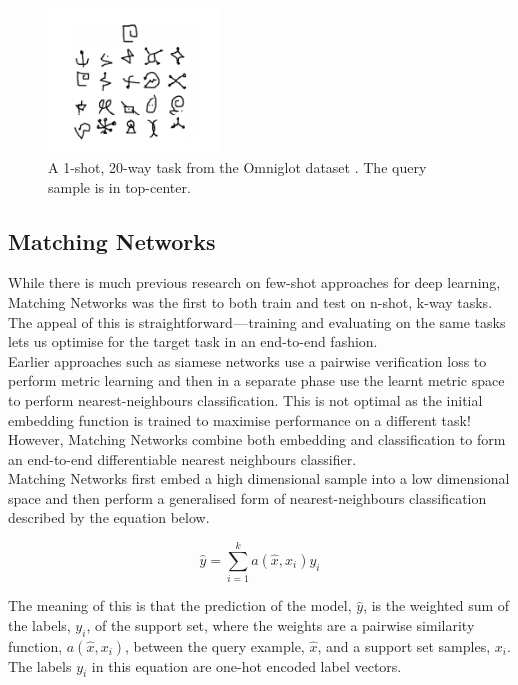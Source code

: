 \documentclass[runningheads,a4paper]{llncs}
\begin{document}
\begin{figure}[!ht]
    \centering
    \includegraphics[width=0.4\textwidth]{background/omniglot_1_shot_20_way_task_example.png}
    \caption{A 1-shot, 20-way task from the Omniglot dataset \cite{omniglot}. The query sample is in top-center.}
    \label{figure:background:omniglot_sample}
\end{figure}

\subsection{Matching Networks}

While there is much previous research on few-shot approaches for deep learning, Matching Networks \cite{matchingnet} was the first to both train and test on n-shot, k-way tasks. The appeal of this is straightforward — training and evaluating on the same tasks lets us optimise for the target task in an end-to-end fashion. \\

Earlier approaches such as siamese networks use a pairwise verification loss to perform metric learning and then in a separate phase use the learnt metric space to perform nearest-neighbours classification. This is not optimal as the initial embedding function is trained to maximise performance on a different task! However, Matching Networks combine both embedding and classification to form an end-to-end differentiable nearest neighbours classifier. \\

Matching Networks first embed a high dimensional sample into a low dimensional space and then perform a generalised form of nearest-neighbours classification described by the equation below.

\begin{equation}
    \hat{y} = \sum_{i=1}^{k} a(\hat{x}, x_{i}) y_{i}
\end{equation}

The meaning of this is that the prediction of the model, $\hat{y}$, is the weighted sum of the labels, $y_i$, of the support set, where the weights are a pairwise similarity function, $a(\hat{x}, x_i)$, between the query example, $\hat{x}$, and a support set samples, $x_i$. The labels $y_i$ in this equation are one-hot encoded label vectors. \\
\end{document}

